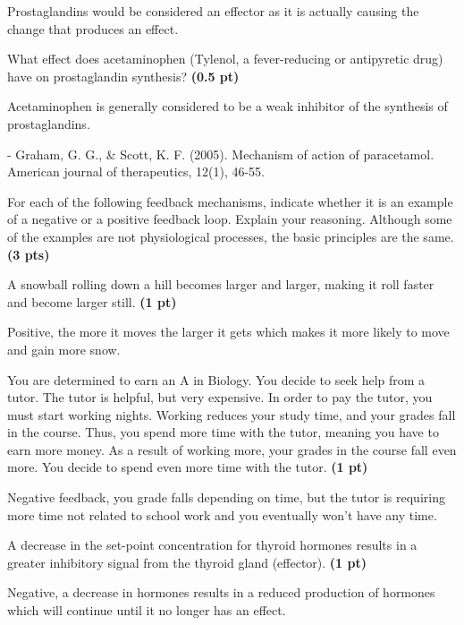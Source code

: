 \documentclass[12pt,a4paper]{article}
\begin{document}
\begin{enumerate}[font=\bfseries, wide]
\begin{enumerate}[font=\bfseries, wide]
        Prostaglandins would be considered an effector as it is actually causing the change that produces an effect.

        {\color{under}\item What effect does acetaminophen (Tylenol, a fever-reducing or antipyretic drug) have on prostaglandin synthesis? \textbf{(0.5 pt)}}

        Acetaminophen is generally considered to be a weak inhibitor of the synthesis of prostaglandins. 

        - Graham, G. G., \& Scott, K. F. (2005). Mechanism of action of paracetamol. American journal of therapeutics, 12(1), 46-55.

    \end{enumerate}
    {\color{under}\item For each of the following feedback mechanisms, indicate whether it is an example of a negative or a positive feedback loop. Explain your reasoning. Although some of the examples are not physiological processes, the basic principles are the same. \textbf{(3 pts)}}
    \begin{enumerate}[font=\bfseries, wide]
        {\color{under}\item A snowball rolling down a hill becomes larger and larger, making it roll faster and become larger still. \textbf{(1 pt)}}

        Positive, the more it moves the larger it gets which makes it more likely to move and gain more snow.

        {\color{under}\item  You are determined to earn an A in Biology. You decide to seek help from a tutor. The tutor is helpful, but very expensive. In order to pay the tutor, you must start working nights. Working reduces your study time, and your grades fall in the course. Thus, you spend more time with the tutor, meaning you have to earn more money. As a result of working more, your grades in the course fall even more. You decide to spend even more time with the tutor. \textbf{(1 pt)}}

        Negative feedback, you grade falls depending on time, but the tutor is requiring more time not related to school work and you eventually won't have any time.

        {\color{under}\item A decrease in the set-point concentration for thyroid hormones results in a greater inhibitory signal from the thyroid gland (effector). \textbf{(1 pt)}}

        Negative, a decrease in hormones results in a reduced production of hormones which will continue until it no longer has an effect.
    \end{enumerate}
\end{enumerate}
\end{document}
